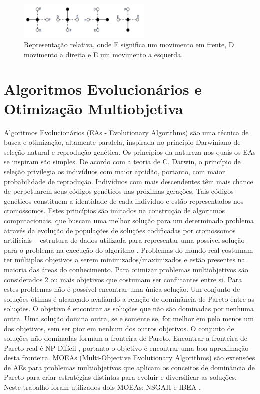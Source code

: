 \documentclass[conference]{IEEEtran}
\begin{document}
\begin{figure}[ht]
	\centering
	\includegraphics[width=2.5in]{figure2.png}
	\caption{Representação relativa, onde F significa um movimento em frente, D movimento a direita e E um movimento a esquerda.}
	\label{fig2}
\end{figure}


\section{Algoritmos Evolucionários e Otimização Multiobjetiva}
Algoritmos Evolucionários (EAs - Evolutionary Algorithms) são uma técnica de busca e otimização, altamente paralela, inspirada no princípio Darwiniano de seleção natural e reprodução genética. Os princípios da natureza nos quais os EAs se inspiram são simples. De acordo com a teoria de C. Darwin, o princípio de seleção privilegia os indivíduos com maior aptidão, portanto, com maior probabilidade de reprodução. Indivíduos com mais descendentes têm mais chance de perpetuarem seus códigos genéticos nas próximas gerações. Tais códigos genéticos constituem a identidade de cada indivíduo e estão representados nos cromossomos. Estes princípios são imitados na construção de algoritmos computacionais, que buscam uma melhor solução para um determinado problema através da evolução de populações de soluções codificadas por cromossomos artificiais – estrutura de dados utilizada para representar uma possível solução para o problema na execução do algoritmo \cite{pacheco1999algoritmos}. 
Problemas do mundo real costumam ter múltiplos objetivos a serem minimizados/maximizados e estão presentes na maioria das áreas do conhecimento. Para otimizar problemas multiobjetivos são considerados 2 ou mais objetivos que costumam ser conflitantes entre si. Para estes problemas não é possível encontrar uma única solução. Um conjunto de soluções ótimas é alcançado avaliando a relação de dominância de Pareto \cite{pareto} entre as soluções. O objetivo é encontrar as soluções que não são dominadas por nenhuma outra. Uma solução domina outra, se e somente se, for melhor em pelo menos um dos objetivos, sem ser pior em nenhum dos outros objetivos. O conjunto de soluções não dominadas formam a fronteira de Pareto. Encontrar a fronteira de Pareto real é NP-Difícil \cite{fonseca2005tutorial}, portanto o objetivo é encontrar uma boa aproximação desta fronteira.
MOEAs (Multi-Objective Evolutionary Algorithms) são extensões de AEs para problemas multiobjetivos que aplicam os  conceitos de dominância de Pareto para criar estratégias distintas para evoluir e diversificar as soluções. Neste trabalho foram utilizados dois MOEAs: NSGAII \cite{deb2002fast} e IBEA \cite{zitzler2004indicator}.
\end{document}
